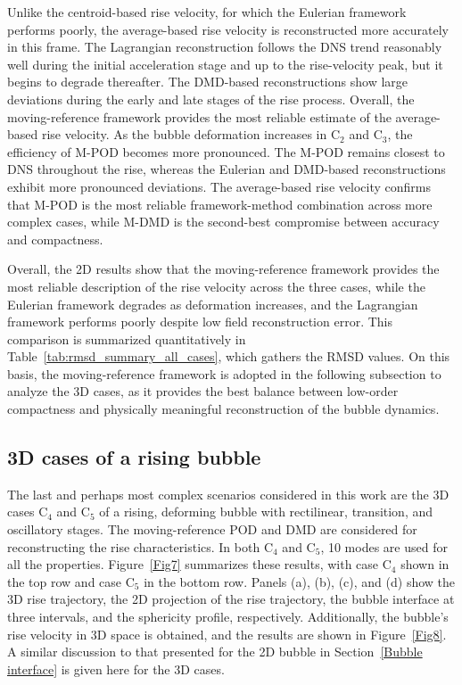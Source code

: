 \documentclass[a4paper,fleqn]{cas-sc}
\begin{document}
	Unlike the centroid-based rise velocity, for which the Eulerian framework performs poorly, the average-based rise velocity is reconstructed more accurately in this frame. The Lagrangian reconstruction follows the DNS trend reasonably well during the initial acceleration stage and up to the rise-velocity peak, but it begins to degrade thereafter. The DMD-based reconstructions show large deviations during the early and late stages of the rise process. Overall, the moving-reference framework provides the most reliable estimate of the average-based rise velocity. As the bubble deformation increases in C$_2$ and C$_3$, the efficiency of M-POD becomes more pronounced. The M-POD remains closest to DNS throughout the rise, whereas the Eulerian and DMD-based reconstructions exhibit more pronounced deviations. The average-based rise velocity confirms that M-POD is the most reliable framework-method combination across more complex cases, while M-DMD is the second-best compromise between accuracy and compactness.
	
	Overall, the 2D results show that the moving-reference framework provides the most reliable description of the rise velocity across the three cases, while the Eulerian framework degrades as deformation increases, and the Lagrangian framework performs poorly despite low field reconstruction error. This comparison is summarized quantitatively in Table~\ref{tab:rmsd_summary_all_cases}, which gathers the RMSD values. On this basis, the moving-reference framework is adopted in the following subsection to analyze the 3D cases, as it provides the best balance between low-order compactness and physically meaningful reconstruction of the bubble dynamics.
	
	\subsection{3D cases of a rising bubble}
	
	The last and perhaps most complex scenarios considered in this work are the 3D cases C$_4$ and C$_5$ of a rising, deforming bubble with rectilinear, transition, and oscillatory stages. The moving-reference POD and DMD are considered for reconstructing the rise characteristics. In both C$_4$ and C$_5$, 10 modes are used for all the properties. Figure~\ref{Fig7} summarizes these results, with case C$_4$ shown in the top row and case C$_5$ in the bottom row. Panels (a), (b), (c), and (d) show the 3D rise trajectory, the 2D projection of the rise trajectory, the bubble interface at three intervals, and the sphericity profile, respectively. Additionally, the bubble's rise velocity in 3D space is obtained, and the results are shown in Figure~\ref{Fig8}. A similar discussion to that presented for the 2D bubble in Section~\ref{Bubble interface} is given here for the 3D cases.
	
\end{document}
